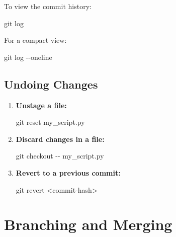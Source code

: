 \documentclass[
  letterpaper,
  DIV=11,
  numbers=noendperiod]{scrreprt}
\newenvironment{Shaded}{\begin{snugshade}}{\end{snugshade}}
\newcommand{\AttributeTok}[1]{\textcolor[rgb]{0.40,0.45,0.13}{#1}}
\newcommand{\FunctionTok}[1]{\textcolor[rgb]{0.28,0.35,0.67}{#1}}
\newcommand{\NormalTok}[1]{\textcolor[rgb]{0.00,0.23,0.31}{#1}}
\newcommand{\OperatorTok}[1]{\textcolor[rgb]{0.37,0.37,0.37}{#1}}
\begin{document}
To view the commit history:

\begin{Shaded}
\begin{Highlighting}[]
\FunctionTok{git}\NormalTok{ log}
\end{Highlighting}
\end{Shaded}

For a compact view:

\begin{Shaded}
\begin{Highlighting}[]
\FunctionTok{git}\NormalTok{ log }\AttributeTok{{-}{-}oneline}
\end{Highlighting}
\end{Shaded}

\subsection{Undoing Changes}\label{undoing-changes}

\begin{enumerate}
\def\labelenumi{\arabic{enumi}.}
\item
  \textbf{Unstage a file:}

\begin{Shaded}
\begin{Highlighting}[]
\FunctionTok{git}\NormalTok{ reset my\_script.py}
\end{Highlighting}
\end{Shaded}
\item
  \textbf{Discard changes in a file:}

\begin{Shaded}
\begin{Highlighting}[]
\FunctionTok{git}\NormalTok{ checkout }\AttributeTok{{-}{-}}\NormalTok{ my\_script.py}
\end{Highlighting}
\end{Shaded}
\item
  \textbf{Revert to a previous commit:}

\begin{Shaded}
\begin{Highlighting}[]
\FunctionTok{git}\NormalTok{ revert }\OperatorTok{\textless{}}\NormalTok{commit{-}hash}\OperatorTok{\textgreater{}}
\end{Highlighting}
\end{Shaded}
\end{enumerate}

\section{Branching and Merging}\label{branching-and-merging}
\end{document}
